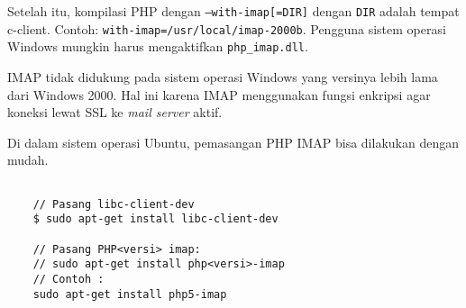 Setelah itu, kompilasi PHP dengan \texttt{--with-imap[=DIR]} dengan \texttt{DIR} adalah tempat c-client. Contoh: \texttt{with-imap=/usr/local/imap-2000b}. Pengguna sistem operasi Windows mungkin harus mengaktifkan \texttt{php\_imap.dll}.

IMAP tidak didukung pada sistem operasi Windows yang versinya lebih lama dari Windows 2000. Hal ini karena IMAP menggunakan fungsi enkripsi agar koneksi lewat SSL ke \textit{mail server} aktif.

Di dalam sistem operasi Ubuntu, pemasangan PHP IMAP bisa dilakukan dengan mudah.
\begin{lstlisting}
	
	// Pasang libc-client-dev
	$ sudo apt-get install libc-client-dev

	// Pasang PHP<versi> imap:
	// sudo apt-get install php<versi>-imap
	// Contoh : 
	sudo apt-get install php5-imap
		
\end{lstlisting}


